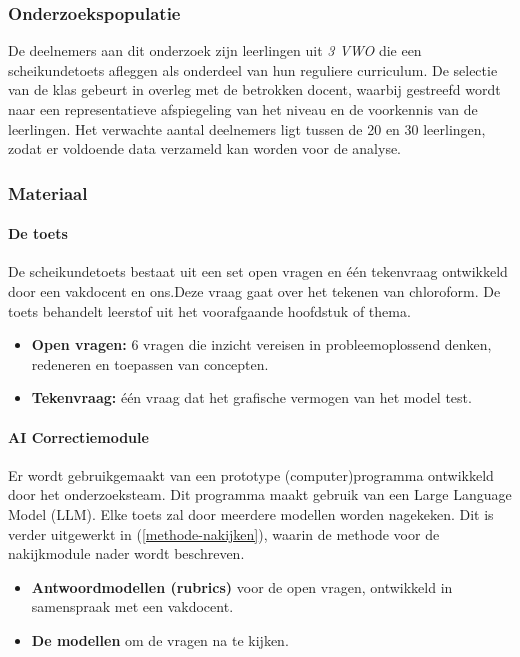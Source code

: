 \documentclass[12pt]{article}
\begin{document}
\subsubsection*{Onderzoekspopulatie}
De deelnemers aan dit onderzoek zijn leerlingen uit \emph{3 VWO} die een scheikundetoets afleggen als onderdeel van hun reguliere curriculum. De selectie van de klas gebeurt in overleg met de betrokken docent, waarbij gestreefd wordt naar een representatieve afspiegeling van het niveau en de voorkennis van de leerlingen. Het verwachte aantal deelnemers ligt tussen de 20 en 30 leerlingen, zodat er voldoende data verzameld kan worden voor de analyse.

\subsubsection*{Materiaal}
\paragraph{De toets} 
De scheikundetoets bestaat uit een set open vragen en één tekenvraag ontwikkeld door een vakdocent en ons.Deze vraag gaat over het tekenen van chloroform. De toets behandelt leerstof uit het voorafgaande hoofdstuk of thema.
\begin{itemize}
    \item \textbf{Open vragen:} 6 vragen die inzicht vereisen in probleemoplossend denken, redeneren en toepassen van concepten.
    \item \textbf{Tekenvraag:} één vraag dat het grafische vermogen van het model test.
\end{itemize}

\paragraph{AI Correctiemodule} 
Er wordt gebruikgemaakt van een prototype (computer)programma ontwikkeld door het onderzoeksteam. Dit programma maakt gebruik van een Large Language Model (LLM). Elke toets zal door meerdere modellen worden nagekeken. Dit is verder uitgewerkt in (\ref{methode-nakijken}), waarin de methode voor de nakijkmodule nader wordt beschreven.
\begin{itemize}
    \item \textbf{Antwoordmodellen (rubrics)} voor de open vragen, ontwikkeld in samenspraak met een vakdocent.
    \item \textbf{De modellen} om de vragen na te kijken.
\end{itemize}
\end{document}
